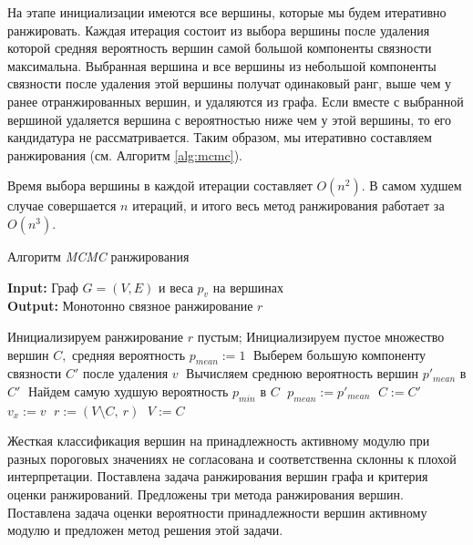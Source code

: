 На этапе инициализации имеются все вершины, которые мы будем итеративно
ранжировать.  Каждая итерация состоит из выбора вершины после удаления которой
средняя вероятность вершин самой большой компоненты связности максимальна.
Выбранная вершина и все вершины из небольшой компоненты связности после
удаления этой вершины получат одинаковый ранг, выше чем у ранее отранжированных
вершин, и удаляются из графа.  Если вместе с выбранной вершиной удаляется
вершина с вероятностью ниже чем у этой вершины, то его кандидатура не
рассматривается. Таким образом, мы итеративно составляем ранжирования (см.
Алгоритм \ref{alg:mcmc}).

Время выбора вершины в каждой итерации составляет $O(n^2)$.  В самом худшем
случае совершается $n$ итераций, и итого весь метод ранжирования работает за
$O(n^3)$.

\begin{algorithm}
    \caption{Алгоритм \emph{MCMC} ранжирования}
    \label{alg:mcmc}
    \hspace*{\algorithmicindent} \textbf{Input:}  Граф $G=(V, E)$ и веса $p_v$ на вершинах\\
    \hspace*{\algorithmicindent} \textbf{Output:} Монотонно связное ранжирование $r$
    \begin{algorithmic}[1]
        \State Инициализируем ранжирование $r$ пустым;
            \State Инициализируем пустое множество вершин $C,$ средняя вероятность $p_{mean}:=1\;$
                \State Выберем большую компоненту связности $C'$ после удаления $v\;$
                \State Вычисляем среднюю вероятность вершин $p'_{mean}$ в $C'\;$
                \State Найдем самую худшую вероятность $p_{min}$ в $C\;$
                    \State $p_{mean} := p'_{mean}\;$
                    \State $C := C'\;$
                    \State $v_x := v\;$
                \EndIf
            \EndFor
            \State $r := (V \setminus C,~r)\;$
            \State $V := C\;$
        \EndWhile
    \end{algorithmic}
\end{algorithm}

\chapterconclusion
Жесткая классификация вершин на принадлежность активному модулю при разных
пороговых значениях не согласована и соответственна склонны к плохой
интерпретации.  Поставлена задача ранжирования вершин графа и критерия оценки
ранжирований. Предложены три метода ранжирования вершин.  Поставлена задача
оценки вероятности принадлежности вершин активному модулю и предложен метод
решения этой задачи.
